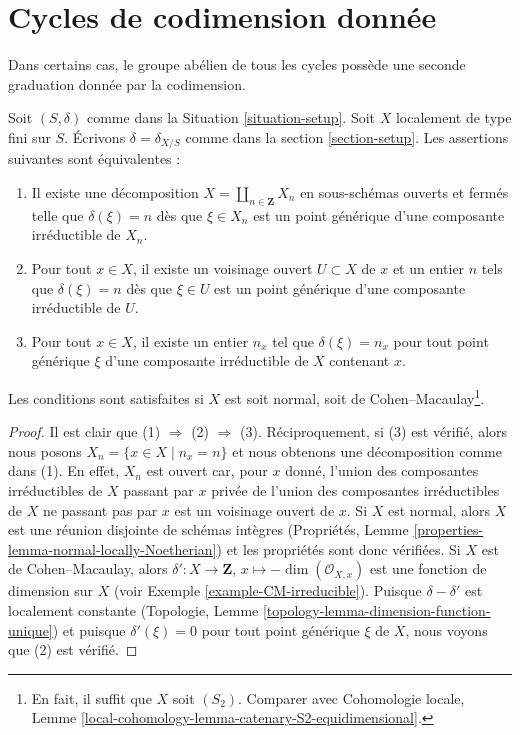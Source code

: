 \section{Cycles de codimension donnée}
\label{section-cycles-codimension}

\noindent
Dans certains cas, le groupe abélien de tous les cycles possède une seconde
graduation donnée par la codimension.

\begin{lemma}
\label{lemma-locally-equidimensional}
Soit $(S, \delta)$ comme dans la Situation \ref{situation-setup}.
Soit $X$ localement de type fini sur $S$. Écrivons
$\delta = \delta_{X/S}$ comme dans la section \ref{section-setup}.
Les assertions suivantes sont équivalentes :
\begin{enumerate}
\item Il existe une décomposition $X = \coprod_{n \in \mathbf{Z}} X_n$
en sous-schémas ouverts et fermés telle que $\delta(\xi) = n$ dès que
$\xi \in X_n$ est un point générique d'une composante irréductible de $X_n$.
\item Pour tout $x \in X$, il existe un voisinage ouvert $U \subset X$
de $x$ et un entier $n$ tels que $\delta(\xi) = n$ dès que
$\xi \in U$ est un point générique d'une composante irréductible de $U$.
\item Pour tout $x \in X$, il existe un entier $n_x$ tel que
$\delta(\xi) = n_x$ pour tout point générique $\xi$ d'une composante
irréductible de $X$ contenant $x$.
\end{enumerate}
Les conditions sont satisfaites si $X$ est soit
normal, soit de Cohen--Macaulay\footnote{En fait, il suffit que
$X$ soit $(S_2)$. Comparer avec Cohomologie locale, Lemme
\ref{local-cohomology-lemma-catenary-S2-equidimensional}.}.
\end{lemma}

\begin{proof}
Il est clair que (1) $\Rightarrow$ (2) $\Rightarrow$ (3).
Réciproquement, si (3) est vérifié, alors nous posons $X_n = \{x \in X \mid n_x = n\}$
et nous obtenons une décomposition comme dans (1). En effet, $X_n$ est ouvert car,
pour $x$ donné, l'union des composantes irréductibles de $X$ passant par $x$
privée de l'union des composantes irréductibles de $X$ ne passant pas par $x$
est un voisinage ouvert de $x$. Si $X$ est normal, alors $X$ est une
réunion disjointe de schémas intègres
(Propriétés, Lemme \ref{properties-lemma-normal-locally-Noetherian})
et les propriétés sont donc vérifiées.
Si $X$ est de Cohen--Macaulay, alors
$\delta' : X \to \mathbf{Z}$, $x \mapsto -\dim(\mathcal{O}_{X, x})$
est une fonction de dimension sur $X$ (voir Exemple \ref{example-CM-irreducible}).
Puisque $\delta - \delta'$ est localement constante
(Topologie, Lemme \ref{topology-lemma-dimension-function-unique})
et puisque $\delta'(\xi) = 0$ pour tout point générique $\xi$ de $X$,
nous voyons que (2) est vérifié.
\end{proof}

